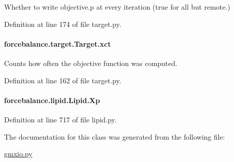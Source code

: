 Whether to write objective.\-p at every iteration (true for all but remote.) 



Definition at line 174 of file target.\-py.

\hypertarget{classforcebalance_1_1target_1_1Target_aad2e385cfbf7b4a68f1c2cb41133fe82}{
\paragraph[{xct}]{\setlength{\rightskip}{0pt plus 5cm}forcebalance.\-target.\-Target.\-xct\hspace{0.3cm}{\ttfamily [inherited]}}}\label{classforcebalance_1_1target_1_1Target_aad2e385cfbf7b4a68f1c2cb41133fe82}


Counts how often the objective function was computed. 



Definition at line 162 of file target.\-py.

\hypertarget{classforcebalance_1_1lipid_1_1Lipid_a56ebab6f8e310afff1b15786ac819eec}{
\paragraph[{Xp}]{\setlength{\rightskip}{0pt plus 5cm}forcebalance.\-lipid.\-Lipid.\-Xp\hspace{0.3cm}{\ttfamily [inherited]}}}\label{classforcebalance_1_1lipid_1_1Lipid_a56ebab6f8e310afff1b15786ac819eec}


Definition at line 717 of file lipid.\-py.



The documentation for this class was generated from the following file\-:\begin{DoxyCompactItemize}
\item 
\hyperlink{gmxio_8py}{gmxio.\-py}\end{DoxyCompactItemize}

